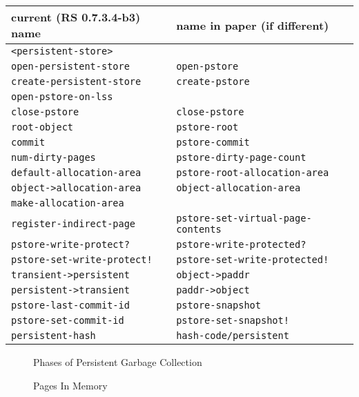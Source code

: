 \documentclass[10pt,letterpaper]{article}
\begin{document}
\begin{tabular}{|l|l|}
\hline
current (RS 0.7.3.4-b3) name    &       name in paper (if different) \\
\hline
\texttt{<persistent-store> }    &  \\
\texttt{open-persistent-store } &       \texttt{open-pstore} \\
\texttt{create-persistent-store }       & \texttt{create-pstore} \\
\texttt{open-pstore-on-lss }    & \\
\texttt{close-pstore }  &       \texttt{close-pstore} \\
\hline

\texttt{root-object }   &       \texttt{pstore-root} \\
\texttt{commit }        &       \texttt{pstore-commit} \\
\texttt{num-dirty-pages }       &       \texttt{pstore-dirty-page-count} \\
\texttt{default-allocation-area }       &       \texttt{pstore-root-allocation-area} \\
\texttt{object->allocation-area }       &       \texttt{object-allocation-area} \\
\texttt{make-allocation-area }  & \\
\texttt{register-indirect-page }        &       \texttt{pstore-set-virtual-page-contents} \\
\hline

\texttt{pstore-write-protect? } &       \texttt{pstore-write-protected?} \\
\texttt{pstore-set-write-protect! }     &       \texttt{pstore-set-write-protected!} \\
\hline

\texttt{transient->persistent } &       \texttt{object->paddr} \\
\texttt{persistent->transient } &       \texttt{paddr->object} \\
\texttt{pstore-last-commit-id } &       \texttt{pstore-snapshot} \\
\texttt{pstore-set-commit-id }  &       \texttt{pstore-set-snapshot!} \\
\hline


\texttt{persistent-hash }       &       \texttt{hash-code/persistent} \\
\hline

\end{tabular}

\begin{figure}
\centering
{}
\caption{Phases of Persistent Garbage Collection}
\end{figure}

\begin{figure}
\centering
{}
\caption{Pages In Memory}
\end{figure}
\end{document}
